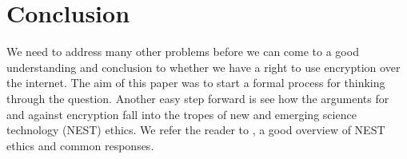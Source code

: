 \documentclass[11pt]{article}
\begin{document}
%

\section{Conclusion}
We need to address many other problems before we can come to a good understanding and conclusion to whether we have a right to use encryption over the internet.
The aim of this paper was to start a formal process for thinking through the question.
Another easy step forward is see how the arguments for and against encryption fall into the tropes of new and emerging science technology (NEST) ethics.
We refer the reader to \cite{nest}, a good overview of NEST ethics and common responses.

%
%
\end{document}
